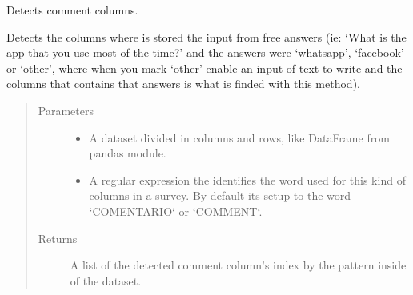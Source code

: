 \documentclass[letterpaper,10pt,english]{sphinxmanual}
\begin{document}

\begin{fulllineitems}
\label{\detokenize{index:SurveyHumpbackWhale.comment_columns_detector}}
Detects comment columns.

Detects the columns where is stored the input from free answers (ie:
‘What is the app that you use most of the time?’ and the answers were
‘whatsapp’, ‘facebook’ or ‘other’, where when you mark ‘other’ enable an
input of text to write and the columns that contains that answers is what
is finded with this method).
\begin{quote}\begin{description}
\item[{Parameters}] \leavevmode\begin{itemize}
\item {} 
 \textendash{} A dataset divided in columns and rows, like DataFrame from
pandas module.

\item {} 
 \textendash{} A regular expression the identifies the word
used for this kind of columns in a survey. By
default its setup to the word ‘\sphinxhyphen{}COMENTARIO\sphinxhyphen{}‘
or ‘\sphinxhyphen{}COMMENT\sphinxhyphen{}‘.

\end{itemize}

\item[{Returns}] \leavevmode
A list of the detected comment column’s index by the pattern inside
of the dataset.

\end{description}\end{quote}

\end{fulllineitems}

\end{document}
